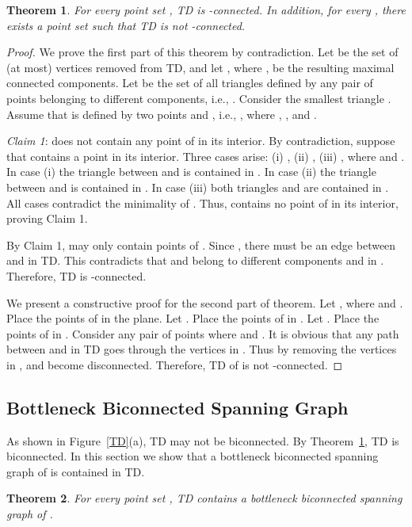 \documentclass[11pt,a4paper]{article}
\newcommand{\kTD}[2]{\text{-}TD#2}
\newtheorem{theorem}{Theorem}
\begin{document}
\begin{theorem}
\label{k-connectivity-thr}
 For every point set , \kTD{k}{} is -connected. In addition, for every , there exists a point set  such that \kTD{k}{} is not -connected.
\end{theorem}
\begin{proof}
We prove the first part of this theorem by contradiction. Let  be the set of (at most)  vertices removed from \kTD{k}{}, and let , where , be the resulting maximal connected components. Let  be the set of all triangles defined by any pair of points belonging to different components, i.e., . Consider the smallest triangle . Assume that  is defined by two points  and , i.e., , where , , and .

{\em Claim 1}:  does not contain any point of  in its interior.
By contradiction, suppose that  contains a point  in its interior. Three cases arise: (i) , (ii) , (iii) , where  and . In case (i) the triangle  between  and  is contained in . In case (ii) the triangle  between  and  is contained in . In case (iii) both triangles  and   are contained in . All cases contradict the minimality of . Thus,  contains no point of  in its interior, proving Claim 1.

By Claim 1,  may only contain points of . Since , there must be an edge between  and  in \kTD{k}{}. This contradicts that  and  belong to different components  and  in . Therefore, \kTD{k}{} is -connected.


We present a constructive proof for the second part of theorem. Let , where  and . Place the points of  in the plane. Let . Place the points of  in . Let . Place the points of  in . Consider any pair  of points where  and . It is obvious that any path between  and  in \kTD{k}{} goes through the vertices in . Thus by removing the vertices in ,  and  become disconnected. Therefore, \kTD{k}{} of  is not -connected. 
\end{proof}
\subsection{Bottleneck Biconnected Spanning Graph}
As shown in Figure~\ref{TD}(a), \kTD{0}{} may not be biconnected. By Theorem~\ref{k-connectivity-thr}, \kTD{1}{} is biconnected. In this section we show that a bottleneck biconnected spanning graph of  is contained in \kTD{1}{}. 

\begin{theorem}
\label{biconnectivity-thr}
 For every point set , \kTD{1}{} contains a bottleneck biconnected spanning graph of .
\end{theorem}
\end{document}
